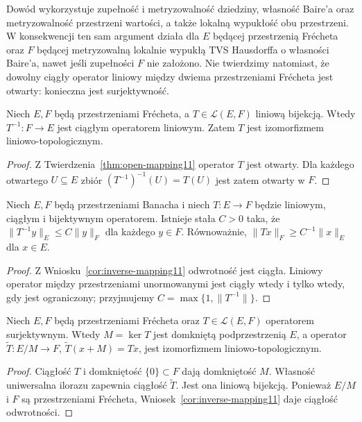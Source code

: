 \begin{uwaga}\label{rem:open-assumptions11}
Dowód wykorzystuje zupełność i metryzowalność dziedziny,
własność Baire'a oraz metryzowalność przestrzeni wartości,
a także lokalną wypukłość obu przestrzeni. W konsekwencji
ten sam argument działa dla $E$ będącej przestrzenią Frécheta
oraz $F$ będącej metryzowalną lokalnie wypukłą TVS Hausdorffa
o własności Baire'a, nawet jeśli zupełności $F$ nie założono.
Nie twierdzimy natomiast, że dowolny ciągły operator
liniowy między dwiema przestrzeniami Frécheta jest otwarty:
konieczna jest surjektywność.
\end{uwaga}

\begin{wniosek}\label{cor:inverse-mapping11}
Niech $E,F$ będą przestrzeniami Frécheta, a
$T\in\mathcal L(E,F)$ liniową bijekcją.
Wtedy $T^{-1}:F\to E$ jest ciągłym operatorem liniowym.
Zatem $T$ jest izomorfizmem liniowo-topologicznym.
\end{wniosek}
\begin{proof}
Z Twierdzenia~\ref{thm:open-mapping11} operator $T$ jest otwarty.
Dla każdego otwartego $U\subseteq E$ zbiór
$(T^{-1})^{-1}(U)=T(U)$ jest zatem otwarty w $F$.
\end{proof}

\begin{wniosek}\label{cor:bounded-inverse11}
Niech $E,F$ będą przestrzeniami Banacha i niech
$T:E\to F$ będzie liniowym, ciągłym i bijektywnym
operatorem. Istnieje stała $C>0$ taka, że
$\|T^{-1}y\|_E\le C\|y\|_F$ dla każdego $y\in F$.
Równoważnie, $\|Tx\|_F\ge C^{-1}\|x\|_E$ dla $x\in E$.
\end{wniosek}
\begin{proof}
Z Wniosku~\ref{cor:inverse-mapping11} odwrotność jest ciągła.
Liniowy operator między przestrzeniami unormowanymi jest
ciągły wtedy i tylko wtedy, gdy jest ograniczony; przyjmujemy
$C=\max\{1,\|T^{-1}\|\}$.
\end{proof}

\begin{wniosek}\label{cor:quotient-open11}
Niech $E,F$ będą przestrzeniami Frécheta oraz
$T\in\mathcal L(E,F)$ operatorem surjektywnym.
Wtedy $M=\ker T$ jest domkniętą podprzestrzenią $E$,
a operator
$\widetilde T:E/M\to F$, $\widetilde T(x+M)=Tx$,
jest izomorfizmem liniowo-topologicznym.
\end{wniosek}
\begin{proof}
Ciągłość $T$ i domkniętość $\{0\}\subset F$ dają
domkniętość $M$. Własność uniwersalna ilorazu zapewnia
ciągłość $\widetilde T$. Jest ona liniową bijekcją.
Ponieważ $E/M$ i $F$ są przestrzeniami Frécheta,
Wniosek~\ref{cor:inverse-mapping11} daje ciągłość odwrotności.
\end{proof}

